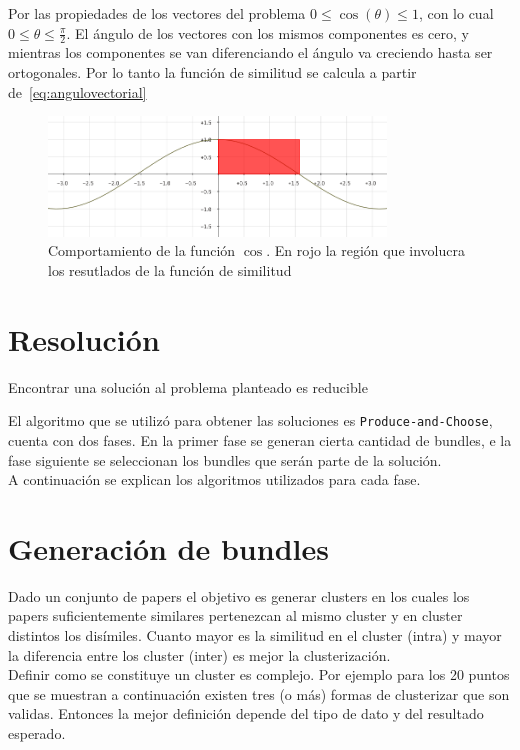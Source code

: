 Por las propiedades de los vectores del problema $0 \leqslant \cos(\theta) \leqslant 1$, con lo cual $0 \leqslant \theta \leqslant \frac{\pi}{2}$.
El ángulo de los vectores con los mismos componentes es cero, y mientras los componentes se van diferenciando el ángulo va creciendo hasta 
ser ortogonales. Por lo tanto la función de similitud se calcula a partir de~\ref{eq:angulovectorial}
\begin{figure}[H]
\centering
\includegraphics[width=0.8\textwidth]{img/coseno.png}
\caption{Comportamiento de la función $\cos$. En rojo la región que involucra los resutlados de la función de similitud}
\label{bus:img-coseno}
\end{figure}


\section{Resolución}
Encontrar una solución al problema planteado es reducible 

El algoritmo que se utilizó para obtener las soluciones es \texttt{Produce-and-Choose}, cuenta con 
dos fases.
En la primer fase se generan cierta cantidad de bundles, e la fase siguiente se seleccionan los 
bundles que serán parte de la solución.\\
A continuación se explican los algoritmos utilizados para cada fase.
\section{Generación de bundles}
Dado un conjunto de papers el objetivo es generar clusters en los cuales los papers suficientemente 
similares pertenezcan al mismo cluster y en cluster distintos los disímiles. Cuanto mayor es la 
similitud en el cluster (intra) y mayor la diferencia entre los cluster (inter) es mejor la 
clusterización.\\
Definir como se constituye un cluster es complejo. Por ejemplo para los 20 puntos que se muestran a 
continuación existen tres (o más) formas de clusterizar que son validas. Entonces la mejor 
definición depende del tipo de dato y del resultado esperado.

